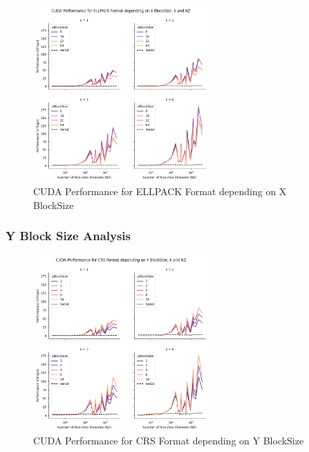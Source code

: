 \documentclass[12pt,oneside]{book} %
\begin{document}
\begin{figure}[H]
    \centering
    \includegraphics[width=0.6\textwidth]{../results/images/CUDA_xBlockSize_ELLPACK.png}
    \caption{CUDA Performance for ELLPACK Format depending on X BlockSize}
    \label{fig:cudaxblocksizeellpack}
\end{figure}

\subsubsection{Y Block Size Analysis}

\begin{figure}[H]
    \centering
    \includegraphics[width=0.6\textwidth]{../results/images/CUDA_yBlockSize_CRS.png}
    \caption{CUDA Performance for CRS Format depending on Y BlockSize}
    \label{fig:cudayblocksizecrs}
\end{figure}
\end{document}
